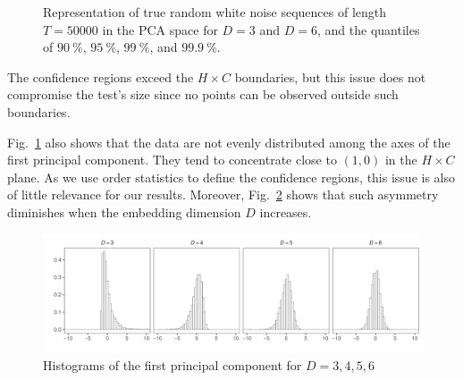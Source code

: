 \documentclass[alpha-refs]{wiley-article}
\begin{document}
\begin{figure}[hbt]
\centering
{}
\caption{Representation of true random white noise sequences of length $T = 50000$ in the PCA space for $D = 3$ and $D = 6$, and the quantiles of $\SI{90}{\percent}$, $\SI{95}{\percent}$, $\SI{99}{\percent}$, and $\SI{99.9}{\percent}$.}
\label{fig:HC-PCA}
\end{figure} 

The confidence regions exceed the $H \times C$ boundaries, but this issue does not compromise the test's size since no points can be observed outside such boundaries.

Fig.~\ref{fig:HC-PCA} also shows that the data are not evenly distributed among the axes of the first principal component.
They tend to concentrate close to $(1,0)$ in the $H\times C$ plane.
As we use order statistics to define the confidence regions, this issue is also of little relevance for our results.
Moreover, Fig.~\ref{fig:PCA-Hist} shows that such asymmetry diminishes when the embedding dimension $D$ increases.

\begin{figure}[hbt]
\centering
\includegraphics[width=\linewidth]{PCA-hist-50k}
\caption{Histograms of the first principal component for $D=3,4,5,6$}
\label{fig:PCA-Hist}
\end{figure}
\end{document}
